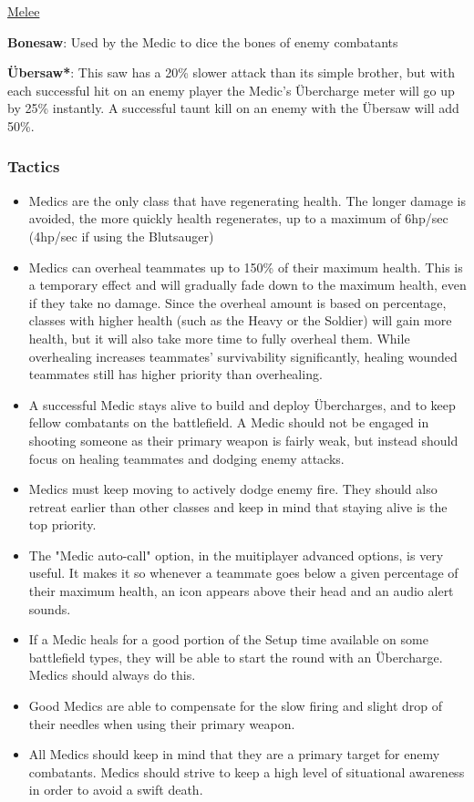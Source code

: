 \begin {center}
\underline {Melee}
\end {center}

{\bf Bonesaw}: Used by the Medic to dice the bones of enemy combatants

{\bf Übersaw*}: This saw has a 20\% slower attack than its simple brother, but with each successful hit on an enemy player the Medic's Übercharge meter will go up by 25\% instantly. A successful taunt kill on an enemy with the Übersaw will add 50\%.

\subsubsection {Tactics}
\begin {itemize}
\item Medics are the only class that have regenerating health. The longer damage is avoided, the more quickly health regenerates, up to a maximum of 6hp/sec (4hp/sec if using the Blutsauger)

\item Medics can overheal teammates up to 150\% of their maximum health. This is a temporary effect and will gradually fade down to the maximum health, even if they take no damage. Since the overheal amount is based on percentage, classes with higher health (such as the Heavy or the Soldier) will gain more health, but it will also take more time to fully overheal them. While overhealing increases teammates' survivability significantly, healing wounded teammates still has higher priority than overhealing.

\item A successful Medic stays alive to build and deploy Übercharges, and to keep fellow combatants on the battlefield. A Medic should not be engaged in shooting someone as their primary weapon is fairly weak, but instead should focus on healing teammates and dodging enemy attacks.

\item Medics must keep moving to actively dodge enemy fire. They should also retreat earlier than other classes and keep in mind that staying alive is the top priority.

\item The "Medic auto-call" option, in the muitiplayer advanced options, is very useful. It makes it so whenever a teammate goes below a given percentage of their maximum health, an icon appears above their head and an audio alert sounds.

\item If a Medic heals for a good portion of the Setup time available on some battlefield types, they will be able to start the round with an Übercharge.  Medics should always do this.

\item Good Medics are able to compensate for the slow firing and slight drop of their needles when using their primary weapon.

\item All Medics should keep in mind that they are a primary target for enemy combatants. Medics should strive to keep a high level of situational awareness in order to avoid a swift death.
\end {itemize}
